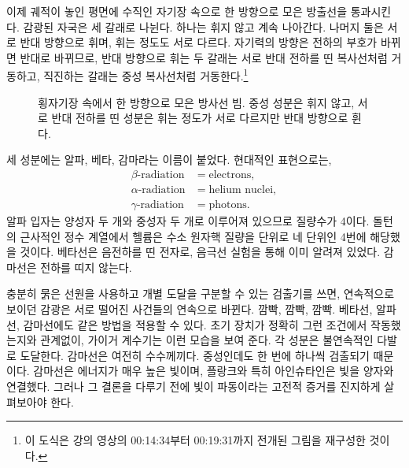 이제 궤적이 놓인 평면에 수직인 자기장 속으로 한 방향으로 모은 방출선을 통과시킨다. 감광된 자국은 세 갈래로 나뉜다. 하나는 휘지 않고 계속 나아간다. 나머지 둘은 서로 반대 방향으로 휘며, 휘는 정도도 서로 다르다. 자기력의 방향은 전하의 부호가 바뀌면 반대로 바뀌므로, 반대 방향으로 휘는 두 갈래는 서로 반대 전하를 띤 복사선처럼 거동하고, 직진하는 갈래는 중성 복사선처럼 거동한다.\footnote{이 도식은 강의 영상의 00:14:34부터 00:19:31까지 전개된 그림을 재구성한 것이다.}

\begin{figure}[h]\centering
{}\caption{횡자기장 속에서 한 방향으로 모은 방사선 빔. 중성 성분은 휘지 않고, 서로 반대 전하를 띤 성분은 휘는 정도가 서로 다르지만 반대 방향으로 휜다.}\end{figure}

세 성분에는 알파, 베타, 감마라는 이름이 붙었다. 현대적인 표현으로는,
\begin{equation}
\begin{aligned}
\beta\text{-radiation} &= \text{electrons},\\
\alpha\text{-radiation} &= \text{helium nuclei},\\
\gamma\text{-radiation} &= \text{photons}.
\end{aligned}
\end{equation}
알파 입자는 양성자 두 개와 중성자 두 개로 이루어져 있으므로 질량수가 4이다. 돌턴의 근사적인 정수 계열에서 헬륨은 수소 원자핵 질량을 단위로 네 단위인 4번에 해당했을 것이다. 베타선은 음전하를 띤 전자로, 음극선 실험을 통해 이미 알려져 있었다. 감마선은 전하를 띠지 않는다.

충분히 묽은 선원을 사용하고 개별 도달을 구분할 수 있는 검출기를 쓰면, 연속적으로 보이던 감광은 서로 떨어진 사건들의 연속으로 바뀐다. 깜빡, 깜빡, 깜빡. 베타선, 알파선, 감마선에도 같은 방법을 적용할 수 있다. 초기 장치가 정확히 그런 조건에서 작동했는지와 관계없이, 가이거 계수기는 이런 모습을 보여 준다. 각 성분은 불연속적인 다발로 도달한다. 감마선은 여전히 수수께끼다. 중성인데도 한 번에 하나씩 검출되기 때문이다. 감마선은 에너지가 매우 높은 빛이며, 플랑크와 특히 아인슈타인은 빛을 양자와 연결했다. 그러나 그 결론을 다루기 전에 빛이 파동이라는 고전적 증거를 진지하게 살펴보아야 한다.

